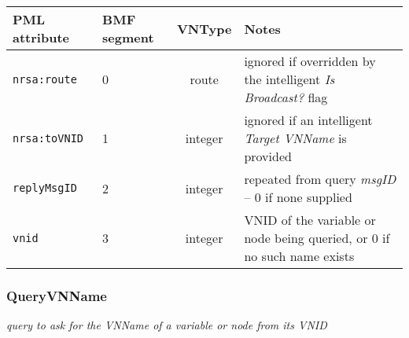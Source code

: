 \documentclass[pdftex,a4paper]{article}
\newcommand{\XMLfont}[1]{{\tt \small #1}}
\begin{document}
\begin{table}[!h]
  \begin{center}
    \label{tab:ReplyVNID}
    \begin{tabular}{|l|p{13mm}|c|p{60mm}|}
      \hline

      \textbf{PML attribute} & \textbf{BMF segment} & \textbf{VNType}
      & \textbf{Notes} \\\hline

      \XMLfont{nrsa:route} & 0 & route & ignored if overridden by the
      intelligent {\em Is Broadcast?} flag \\ \hline

      \XMLfont{nrsa:toVNID} & 1 & integer & ignored if an intelligent {\em
      Target VNName} is provided \\\hline

      \XMLfont{replyMsgID} & 2 & integer & repeated from query {\em
      msgID} -- 0 if none supplied \\\hline

      \XMLfont{vnid} & 3 & integer & VNID of the variable or node
      being queried, or 0 if no such name exists \\\hline

    \end{tabular}
  \end{center}
\end{table}

\clearpage

\subsubsection{QueryVNName}

{\em query to ask for the VNName of a variable or node from its VNID}
\end{document}
